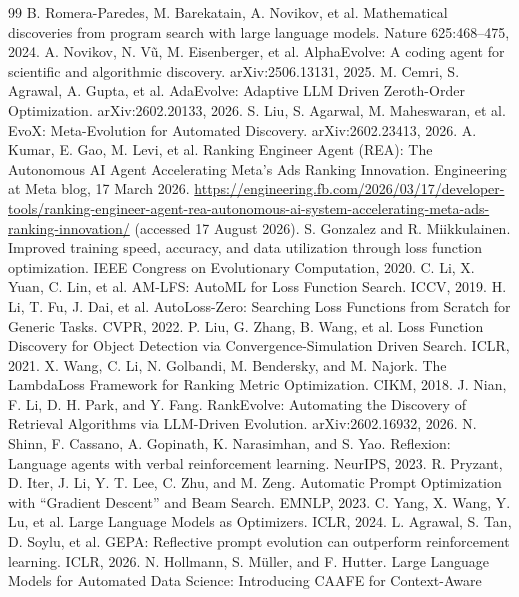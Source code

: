 \documentclass[]{ceurart}
\begin{document}
\begin{thebibliography}{99}
 B. Romera-Paredes, M. Barekatain, A. Novikov, et al.
Mathematical discoveries from program search with large language models.
Nature 625:468--475, 2024.
 A. Novikov, N. V\~{u}, M. Eisenberger, et al.
AlphaEvolve: A coding agent for scientific and algorithmic discovery.
arXiv:2506.13131, 2025.
 M. Cemri, S. Agrawal, A. Gupta, et al. AdaEvolve:
Adaptive LLM Driven Zeroth-Order Optimization. arXiv:2602.20133, 2026.
 S. Liu, S. Agarwal, M. Maheswaran, et al. EvoX:
Meta-Evolution for Automated Discovery. arXiv:2602.23413, 2026.
 A. Kumar, E. Gao, M. Levi, et al. Ranking Engineer Agent (REA):
The Autonomous AI Agent Accelerating Meta's Ads Ranking Innovation.
Engineering at Meta blog, 17 March 2026.
\url{https://engineering.fb.com/2026/03/17/developer-tools/ranking-engineer-agent-rea-autonomous-ai-system-accelerating-meta-ads-ranking-innovation/}
(accessed 17 August 2026).
 S. Gonzalez and R. Miikkulainen. Improved training speed,
accuracy, and data utilization through loss function optimization. IEEE
Congress on Evolutionary Computation, 2020.
 C. Li, X. Yuan, C. Lin, et al. AM-LFS: AutoML for Loss
Function Search. ICCV, 2019.
 H. Li, T. Fu, J. Dai, et al. AutoLoss-Zero: Searching
Loss Functions from Scratch for Generic Tasks. CVPR, 2022.
 P. Liu, G. Zhang, B. Wang, et al. Loss Function
Discovery for Object Detection via Convergence-Simulation Driven Search.
ICLR, 2021.
 X. Wang, C. Li, N. Golbandi, M. Bendersky, and
M. Najork. The LambdaLoss Framework for Ranking Metric Optimization. CIKM,
2018.
 J. Nian, F. Li, D. H. Park, and Y. Fang. RankEvolve:
Automating the Discovery of Retrieval Algorithms via LLM-Driven Evolution.
arXiv:2602.16932, 2026.
 N. Shinn, F. Cassano, A. Gopinath, K. Narasimhan, and
S. Yao. Reflexion: Language agents with verbal reinforcement learning.
NeurIPS, 2023.
 R. Pryzant, D. Iter, J. Li, Y. T. Lee, C. Zhu, and
M. Zeng. Automatic Prompt Optimization with ``Gradient Descent'' and Beam
Search. EMNLP, 2023.
 C. Yang, X. Wang, Y. Lu, et al. Large Language Models as
Optimizers. ICLR, 2024.
 L. Agrawal, S. Tan, D. Soylu, et al. GEPA: Reflective prompt
evolution can outperform reinforcement learning. ICLR, 2026.
 N. Hollmann, S. M\"{u}ller, and F. Hutter. Large Language
Models for Automated Data Science: Introducing CAAFE for Context-Aware

\end{thebibliography}
\end{document}
